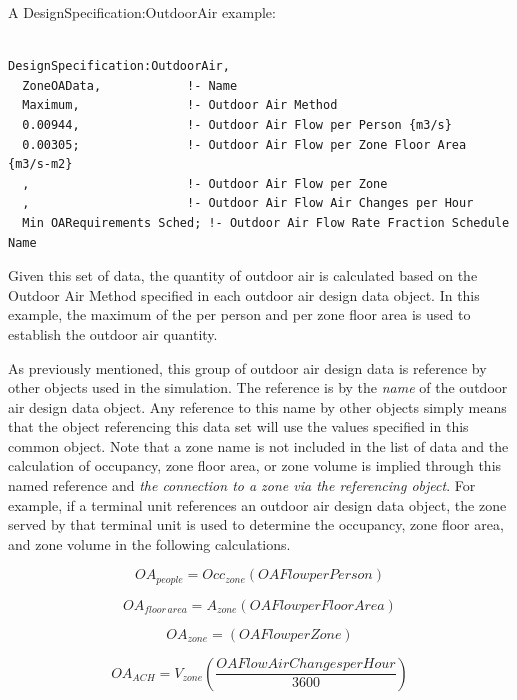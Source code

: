 A DesignSpecification:OutdoorAir example:

\begin{lstlisting}

DesignSpecification:OutdoorAir,
  ZoneOAData,            !- Name
  Maximum,               !- Outdoor Air Method
  0.00944,               !- Outdoor Air Flow per Person {m3/s}
  0.00305;               !- Outdoor Air Flow per Zone Floor Area {m3/s-m2}
  ,                      !- Outdoor Air Flow per Zone
  ,                      !- Outdoor Air Flow Air Changes per Hour
  Min OARequirements Sched; !- Outdoor Air Flow Rate Fraction Schedule Name
\end{lstlisting}

Given this set of data, the quantity of outdoor air is calculated based on the Outdoor Air Method specified in each outdoor air design data object. In this example, the maximum of the per person and per zone floor area is used to establish the outdoor air quantity.

As previously mentioned, this group of outdoor air design data is reference by other objects used in the simulation. The reference is by the \emph{name} of the outdoor air design data object. Any reference to this name by other objects simply means that the object referencing this data set will use the values specified in this common object. Note that a zone name is not included in the list of data and the calculation of occupancy, zone floor area, or zone volume is implied through this named reference and \emph{the connection to a zone via the referencing object}. For example, if a terminal unit references an outdoor air design data object, the zone served by that terminal unit is used to determine the occupancy, zone floor area, and zone volume in the following calculations.

\begin{equation}
O{A_{people}} = Oc{c_{zone}}\left( {OAFlowperPerson} \right)
\end{equation}

\begin{equation}
O{A_{floor\,area}} = {A_{zone}}\left( {OAFlowperFloorArea} \right)
\end{equation}

\begin{equation}
O{A_{zone}} = \left( {OAFlowperZone} \right)
\end{equation}

\begin{equation}
O{A_{ACH}} = {V_{zone}}\left( {{\frac{{OAFlowAirChangesperHour}}{{3600}}}} \right)
\end{equation}

